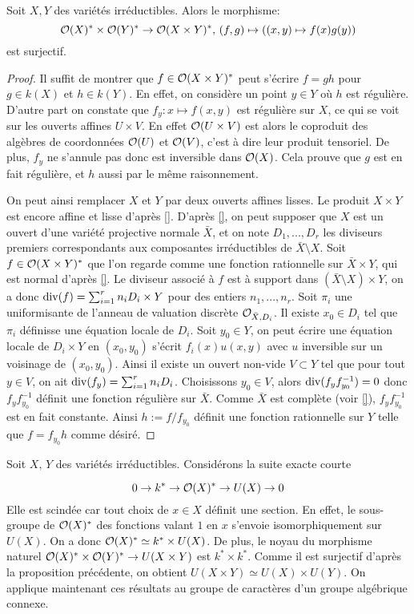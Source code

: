 \begin{prop}
Soit $X, Y$ des variétés irréductibles. Alors le morphisme:
$$\mathcal{O}(X)^*\times\mathcal{O}(Y)^*\rightarrow\mathcal{O}(X\times Y)^*,\,(f,g)\mapsto ((x,y )\mapsto f(x)g(y))$$
est surjectif.
\end{prop}
\begin{proof}
Il suffit de montrer que $f\in \mathcal{O}(X\times Y)^*$ peut s'écrire $f=gh$ pour $g\in k(X)$ et $h\in k(Y)$. En effet, on considère un point $y\in Y$ où $h$ est régulière. D'autre part on constate que $f_y:x\mapsto f(x,y)$ est régulière sur $X$, ce qui se voit sur les ouverts affines $U\times V$. En effet $\mathcal{O}(U\times V)$ est alors le coproduit des algèbres de coordonnées $\mathcal{O}(U)$ et $\mathcal{O}(V)$, c'est à dire leur produit tensoriel. De plus, $f_y$ ne s'annule pas donc est inversible dans $\mathcal{O}(X)$. Cela prouve que $g$ est en fait régulière, et $h$ aussi par le même raisonnement.

On peut ainsi remplacer $X$ et $Y$ par deux ouverts affines lisses. Le produit  $X\times Y$ est encore affine et lisse d'après \ref{}. D'après \ref{}, on peut supposer que $X$ est un ouvert d'une variété projective normale $\bar{X}$, et on note $D_1,...,D_r$ les diviseurs premiers correspondants aux composantes irréductibles de $\bar{X}\setminus X$. Soit $f\in \mathcal{O}(X\times Y)^*$ que l'on regarde comme une fonction rationnelle sur $\bar{X}\times Y$, qui est normal d'après \ref{}. Le diviseur associé à $f$ est à support dans $(\bar{X}\setminus X)\times Y$, on a donc $\operatorname{div}(f)=\sum_{i=1}^rn_iD_i\times Y$ pour des entiers $n_1,...,n_r$. Soit $\pi_i$ une uniformisante de l'anneau de valuation discrète $\mathcal{O}_{\bar{X},D_i}$. Il existe $x_0\in D_i$ tel que $\pi_i$ définisse une équation locale de $D_i$. Soit $y_0\in Y$, on peut écrire une équation locale de $D_i\times Y$ en $(x_0,y_0)$ s'écrit $f_i(x)u(x,y)$ avec $u$ inversible sur un voisinage de $(x_0,y_0)$. Ainsi il existe un ouvert non-vide $V\subset Y$ tel que pour tout $y\in V$, on ait $\operatorname{div}(f_y)=\sum_{i=1}^rn_iD_i$. Choisissons $y_0\in V$, alors $\operatorname{div}(f_yf_{y_0}^{-1})=0$ donc $f_yf_{y_0}^{-1}$ définit une fonction régulière sur $\bar{X}$. Comme $\bar{X}$ est complète (voir \ref{}), $f_yf_{y_0}^{-1}$ est en fait constante. Ainsi $h:=f/f_{y_0}$ définit une fonction rationnelle sur $Y$ telle que $f=f_{y_0}h$ comme désiré.
\end{proof}

\noindent Soit $X,\,Y$ des variétés irréductibles. Considérons la suite exacte courte

\begin{equation}\label{eq:sesUnitGroup}
0\rightarrow k^* \rightarrow \mathcal{O}(X)^*\rightarrow U(X) \rightarrow 0
\end{equation}
Elle est scindée car tout choix de $x\in X$ définit une section. En effet, le sous-groupe de $\mathcal{O}(X)^*$ des fonctions valant $1$ en $x$ s'envoie isomorphiquement sur $U(X)$. On a donc $\mathcal{O}(X)^*\simeq k^*\times U(X)$. De plus, le noyau du morphisme naturel $\mathcal{O}(X)^*\times\mathcal{O}(Y)^*\rightarrow U(X\times Y)$ est $k^*\times k^*$. Comme il est surjectif d'après la proposition précédente, on obtient $U(X\times Y)\simeq U(X)\times U(Y)$.
On applique maintenant ces résultats au groupe de caractères d'un groupe algébrique connexe. 


